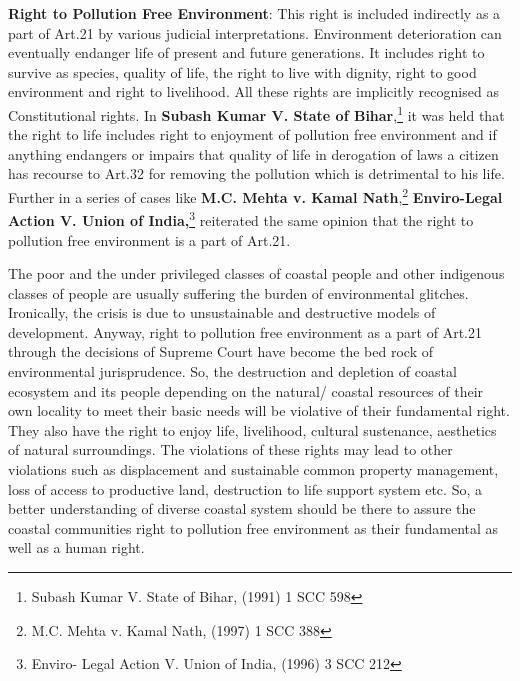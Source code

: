 \begin{multicols}{2}
\noi
{\large\bfseries Right to Pollution Free Environment}: This right is included indirectly as a
part of Art.21 by various judicial interpretations. Environment deterioration can eventually
endanger life of present and future generations. It includes right to survive as species, quality
of life, the right to live with dignity, right to good environment and right to livelihood. All
these rights are implicitly recognised as Constitutional rights. In \textbf{Subash Kumar V. State of
Bihar},\footnote{Subash Kumar V. State of Bihar, (1991) 1 SCC 598} it was held that the right to life includes right to enjoyment of pollution free
environment and if anything endangers or impairs that quality of life in derogation of laws a
citizen has recourse to Art.32 for removing the pollution which is detrimental to his life.
Further in a series of cases like \textbf{M.C. Mehta v. Kamal Nath},\footnote{M.C. Mehta v. Kamal Nath, (1997) 1 SCC 388} \textbf{Enviro-Legal Action V.
Union of India,}\footnote{Enviro- Legal Action V. Union of India, (1996) 3 SCC 212} reiterated the same opinion that the right to pollution free environment is a
part of Art.21.

\noi
The poor and the under privileged classes of coastal people and other indigenous classes of
people are usually suffering the burden of environmental glitches. Ironically, the crisis is due
to unsustainable and destructive models of development. Anyway, right to pollution free 
environment as a part of Art.21 through the decisions of Supreme Court have become the bed
rock of environmental jurisprudence. So, the destruction and depletion of coastal ecosystem
and its people depending on the natural/ coastal resources of their own locality to meet their
basic needs will be violative of their fundamental right. They also have the right to enjoy life,
livelihood, cultural sustenance, aesthetics of natural surroundings. The violations of these
rights may lead to other violations such as displacement and sustainable common property
management, loss of access to productive land, destruction to life support system etc. So, a
better understanding of diverse coastal system should be there to assure the coastal
communities right to pollution free environment as their fundamental as well as a human
right.


\end{multicols}
